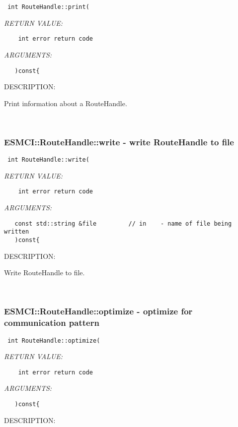   
\begin{verbatim} int RouteHandle::print(\end{verbatim}{\em RETURN VALUE:}
\begin{verbatim}    int error return code\end{verbatim}{\em ARGUMENTS:}
\begin{verbatim}   )const{\end{verbatim}
{\sf DESCRIPTION:\\ }


    Print information about a RouteHandle.
   
 
\mbox{}\hrulefill\ 
 
\subsubsection [ESMCI::RouteHandle::write] {ESMCI::RouteHandle::write - write RouteHandle to file}


  
\begin{verbatim} int RouteHandle::write(\end{verbatim}{\em RETURN VALUE:}
\begin{verbatim}    int error return code\end{verbatim}{\em ARGUMENTS:}
\begin{verbatim}   const std::string &file         // in    - name of file being written
   )const{\end{verbatim}
{\sf DESCRIPTION:\\ }


    Write RouteHandle to file.
   
 
\mbox{}\hrulefill\ 
 
\subsubsection [ESMCI::RouteHandle::optimize] {ESMCI::RouteHandle::optimize - optimize for communication pattern}


  
\begin{verbatim} int RouteHandle::optimize(\end{verbatim}{\em RETURN VALUE:}
\begin{verbatim}    int error return code\end{verbatim}{\em ARGUMENTS:}
\begin{verbatim}   )const{\end{verbatim}
{\sf DESCRIPTION:\\ }


